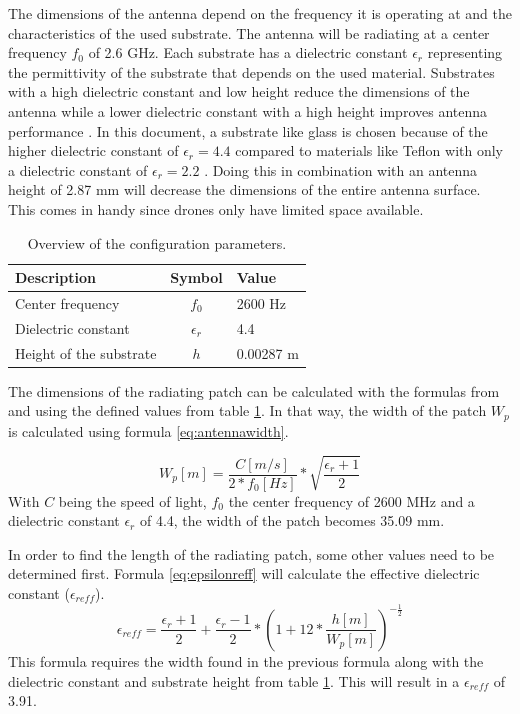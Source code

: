 The dimensions of the antenna depend on the frequency it is operating at and the characteristics of the used substrate.
The antenna will be radiating at a center frequency $f_0$ of 2.6 GHz. Each substrate has a \gls{dielectric constant} $\epsilon_r$ representing 
the permittivity of the substrate that depends on the used material.
Substrates with a high \gls{dielectric constant} and low height 
reduce the dimensions of the antenna
while a lower \gls{dielectric constant} with a high height improves antenna performance \cite{J14_antennadesign,J15_antennadesign}. 
In this document, a substrate like glass 
is chosen because of the higher \gls{dielectric constant} of $\epsilon_r = 4.4$ compared to materials like Teflon with only a dielectric 
constant of $\epsilon_r = 2.2$ \cite{J14_antennadesign}. 
Doing this in combination with an antenna height of 2.87 mm will decrease the dimensions of the entire antenna surface.
This comes in handy since drones only have limited space available.

\begin{table}[h!]
\centering
\begin{tabular}{|l|c|l|}
\hline
 Description            & Symbol          & Value         \\    \hline
 Center frequency       & $f_0$           & 2600 Hz       \\ 
 Dielectric constant    & $\epsilon_r$    & 4.4         \\ 
 Height of the substrate & $h$             & 0.00287 m    \\ \hline
\end{tabular}
\caption{Overview of the configuration parameters.}
\label{table:antennaparas}
\end{table}

The dimensions of the radiating patch can be calculated with the formulas from \cite{J14_antennadesign} and \cite{J15_antennadesign}
using the defined values from table \ref{table:antennaparas}. In that way, the width of the patch $W_{p}$ is calculated using formula \ref{eq:antennawidth}.

\begin{equation} 
W_{p} [m] = \frac{C [m/s]}{2*f_0 [Hz]}*\sqrt{\frac{\epsilon_r+1}{2}}
\label{eq:antennawidth}
\end{equation}
With $C$ being the speed of light, $f_0$ the center frequency of 2600 MHz and a \gls{dielectric constant} $\epsilon_r$ of 4.4, the width of the patch becomes 35.09 mm.

In order to find the length of the radiating patch, some other values need to be determined first. Formula \ref{eq:epsilonreff} will
calculate the effective \gls{dielectric constant} ($\epsilon_{reff}$).
\begin{equation} 
\epsilon_{reff} = \frac{\epsilon_r+1}{2}+  \frac{\epsilon_r-1}{2} * \left(1+12*\frac{h [m]}{W_{p} [m] }\right)^{-\frac{1}{2}}
\label{eq:epsilonreff}
\end{equation}
This formula requires the width found in the previous formula along with the \gls{dielectric constant} and substrate height from table \ref{table:antennaparas}.
This will result in a $\epsilon_{reff}$ of 3.91.

